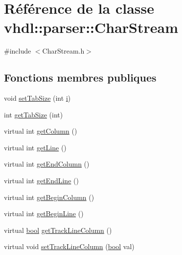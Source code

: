 \hypertarget{classvhdl_1_1parser_1_1_char_stream}{}\section{Référence de la classe vhdl\+:\+:parser\+:\+:Char\+Stream}
\label{classvhdl_1_1parser_1_1_char_stream}


{\ttfamily \#include $<$Char\+Stream.\+h$>$}

\subsection*{Fonctions membres publiques}
\begin{DoxyCompactItemize}
\item 
void \hyperlink{classvhdl_1_1parser_1_1_char_stream_a3b9ca593901a797f6076230835b64b08}{set\+Tab\+Size} (int \hyperlink{060__command__switch_8tcl_a8c90afd4641b25be86bd09983c3cbee0}{i})
\item 
int \hyperlink{classvhdl_1_1parser_1_1_char_stream_a7ce09e7fc7cf77b49e73d064ff5f6f52}{get\+Tab\+Size} (int)
\item 
virtual int \hyperlink{classvhdl_1_1parser_1_1_char_stream_aba9c006a8d5510d8054df8dc83c4f063}{get\+Column} ()
\item 
virtual int \hyperlink{classvhdl_1_1parser_1_1_char_stream_a35f578cd3509a81008518b7effdefda1}{get\+Line} ()
\item 
virtual int \hyperlink{classvhdl_1_1parser_1_1_char_stream_a02054db796d1066becc894c70f429a3d}{get\+End\+Column} ()
\item 
virtual int \hyperlink{classvhdl_1_1parser_1_1_char_stream_abac99aec0fdf89f82387c205f5e55e5a}{get\+End\+Line} ()
\item 
virtual int \hyperlink{classvhdl_1_1parser_1_1_char_stream_a3e0f2c3e5fa9250abf00696661639488}{get\+Begin\+Column} ()
\item 
virtual int \hyperlink{classvhdl_1_1parser_1_1_char_stream_a3f296517fa30b9728af5ec8a9417800d}{get\+Begin\+Line} ()
\item 
virtual \hyperlink{qglobal_8h_a1062901a7428fdd9c7f180f5e01ea056}{bool} \hyperlink{classvhdl_1_1parser_1_1_char_stream_aa34c97a27cde33d957e4f6eaabb025b1}{get\+Track\+Line\+Column} ()
\item 
virtual void \hyperlink{classvhdl_1_1parser_1_1_char_stream_a12712c9866fb3495782fc0f28994d4d9}{set\+Track\+Line\+Column} (\hyperlink{qglobal_8h_a1062901a7428fdd9c7f180f5e01ea056}{bool} val)

\end{DoxyCompactItemize}
